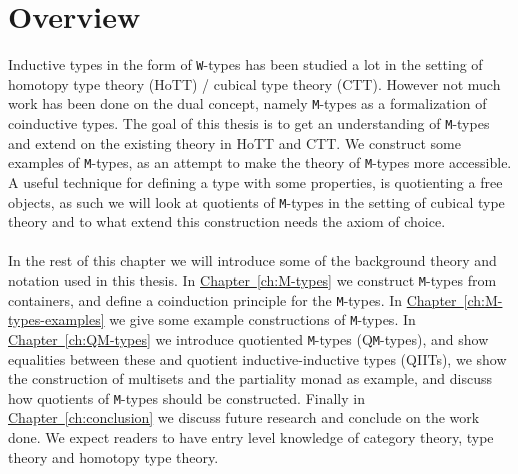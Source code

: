 \documentclass[twoside,11pt,openright]{report}
\theoremstyle{plain} %
\theoremstyle{definition}
\theoremstyle{remark}
\newcommand*{\chapterref}[1]{\hyperref[ch:#1]{Chapter~\ref*{ch:#1}}}
\begin{document}
\section{Overview}
Inductive types in the form of \texttt{W}-types has been studied a lot in the setting of homotopy type theory (HoTT) / cubical type theory (CTT). However not much work has been done on the dual concept, namely \texttt{M}-types as a formalization of coinductive types. The goal of this thesis is to get an understanding of \texttt{M}-types and extend on the existing theory in HoTT and CTT. We construct some examples of \texttt{M}-types, as an attempt to make the theory of \texttt{M}-types more accessible. A useful technique for defining a type with some properties, is quotienting a free objects, as such we will look at quotients of \texttt{M}-types in the setting of cubical type theory and to what extend this construction needs the axiom of choice.
\\ \\
In the rest of this chapter we will introduce some of the background theory and notation used in this thesis. In \chapterref{M-types} we construct \texttt{M}-types from containers, and define a coinduction principle for the \texttt{M}-types. In \chapterref{M-types-examples} we give some example constructions of \texttt{M}-types. In \chapterref{QM-types} we introduce quotiented \texttt{M}-types (Q\texttt{M}-types), and show equalities between these and quotient inductive-inductive types (QIITs), we show the construction of multisets and the partiality monad as example, and discuss how quotients of \texttt{M}-types should be constructed. Finally in \chapterref{conclusion} we discuss future research and conclude on the work done.
We expect readers to have entry level knowledge of category theory, type theory and homotopy type theory.
\end{document}
